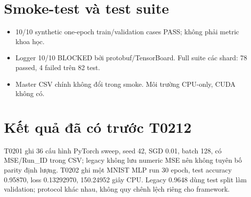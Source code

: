 \section{Smoke-test và test suite}
\begin{itemize}
\item 10/10 synthetic one-epoch train/validation cases PASS; không phải metric khoa học.
\item Logger 10/10 BLOCKED bởi protobuf/TensorBoard. Full suite các shard: 78 passed, 4 failed trên 82 test.
\item Master CSV chính không đổi trong smoke. Môi trường CPU-only, CUDA không có.
\end{itemize}

\section{Kết quả đã có trước T0212}
T0201 ghi 36 cấu hình PyTorch sweep, seed 42, SGD 0.01, batch 128, có MSE/Run_ID trong CSV; legacy không lưu numeric MSE nên không tuyên bố parity định lượng. T0202 ghi một MNIST MLP run 30 epoch, test accuracy 0.95870, loss 0.13292970, 150.24952 giây CPU. Legacy 0.9648 dùng test split làm validation; protocol khác nhau, không quy chênh lệch riêng cho framework.

